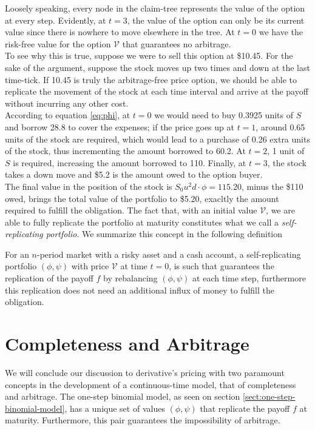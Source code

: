 \documentclass[../TGMAFFIRO.tex]{subfiles}
\begin{document}
Loosely speaking, every node in the claim-tree represents the value of the option at every step. Evidently, at $t=3$, the value of the option can only be its current value since there is nowhere to move elsewhere in the tree. At $t=0$ we have the risk-free value for the option $\mathcal V$ that guarantees no arbitrage.\\

To see why this is true, suppose we were to sell this option at \$10.45. For the sake of the argument, suppose the stock moves up two times and down at the last time-tick. If 10.45 is truly the arbitrage-free price option, we should be able to replicate the movement of the stock at each time interval and arrive at the payoff without incurring any other cost.\\

According to equation \ref{eq:phi}, at $t=0$ we would need to buy 0.3925 units of $S$ and borrow 28.8 to cover the expenses; if the price goes up at $t=1$, around 0.65 units of the stock are required, which would lead to a purchase of 0.26 extra units of the stock, thus incrementing the amount borrowed to 60.2. At $t=2$, 1 unit of $S$ is required, increasing the amount borrowed to 110. Finally, at $t=3$, the stock takes a down move and \$5.2 is the amount owed to the option buyer. \\

The final value in the position of the stock is $S_0 u ^ 2 d \cdot \phi = 115.20$, minus the \$110 owed, brings the total value of the portfolio to \$5.20, exacltly the amount required to fulfill the obligation. The fact that, with an initial value $\mathcal V$, we are able to fully replicate the portfolio at maturity constitutes what we call a \textit{self-replicating portfolio}. We summarize this concept in the following definition

\begin{definition}
	For an $n$-period market with a risky asset and a cash account, a self-replicating portfolio $(\phi, \psi)$ with price $\mathcal V$ at time $t=0$, is such that guarantees the replication of the payoff $f$ by rebalancing $(\phi, \psi)$ at each time step, furthermore this replication does not need an additional influx of money to fulfill the obligation.
\end{definition}

\section{Completeness and Arbitrage}
We will conclude our discussion to derivative's pricing with two paramount concepts in the development of a continuous-time model, that of completeness and arbitrage. The one-step binomial model, as seen on section \ref{sect:one-step-binomial-model}, has a unique set of values $(\phi, \psi)$ that replicate the payoff $f$ at maturity. Furthermore, this pair guarantees the impossibility of arbitrage.\\
\end{document}
